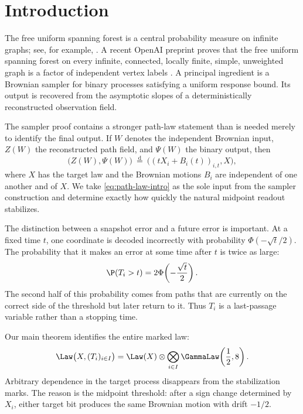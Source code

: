 \section{Introduction}

The free uniform spanning forest is a central probability measure on infinite
graphs; see, for example, \cite{BLPS2001,LyonsPeres2016}.  A recent OpenAI
preprint proves that the free uniform spanning forest on every infinite,
connected, locally finite, simple, unweighted graph is a factor of independent
vertex labels \cite{OpenAI2026FUSF}.  A principal ingredient is a Brownian
sampler for binary processes satisfying a uniform response bound.  Its output
is recovered from the asymptotic slopes of a deterministically reconstructed
observation field.

The sampler proof contains a stronger path-law statement than is needed merely
to identify the final output.  If $W$ denotes the independent Brownian input,
$Z(W)$ the reconstructed path field, and $\Psi(W)$ the binary output, then
\begin{equation}\label{eq:path-law-intro}
  \bigl(Z(W),\Psi(W)\bigr)
  \ \stackrel{\mathrm d}{=}\
  \bigl((tX_i+B_i(t))_{i,t},X\bigr),
\end{equation}
where $X$ has the target law and the Brownian motions $B_i$ are independent of
one another and of $X$.  We take \eqref{eq:path-law-intro} as the sole input
from the sampler construction and determine exactly how quickly the natural
midpoint readout stabilizes.

The distinction between a snapshot error and a future error is important.  At
a fixed time $t$, one coordinate is decoded incorrectly with probability
$\Phi(-\sqrt t/2)$.  The probability that it makes an error at some time after
$t$ is twice as large:
\begin{equation}\label{eq:factor-two-intro}
  \P(T_i>t)=2\Phi\!\left(-\frac{\sqrt t}{2}\right).
\end{equation}
The second half of this probability comes from paths that are currently on the
correct side of the threshold but later return to it.  Thus $T_i$ is a
last-passage variable rather than a stopping time.

Our main theorem identifies the entire marked law:
\begin{equation}\label{eq:product-marking-intro}
  \Law\bigl(X,(T_i)_{i\in I}\bigr)
  =\Law(X)\otimes
  \bigotimes_{i\in I}\GammaLaw\!\left(\frac12,8\right).
\end{equation}
Arbitrary dependence in the target process disappears from the stabilization
marks.  The reason is the midpoint threshold: after a sign change determined
by $X_i$, either target bit produces the same Brownian motion with drift
$-1/2$.

